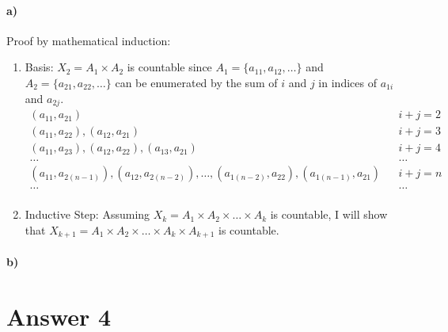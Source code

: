 \documentclass[12pt]{article}
\newcommand\+{\mkern2mu}
\begin{document}
\paragraph{a)}
Proof by mathematical induction:
\begin{enumerate}
\item Basis: $X_2 = A_1 \times A_2$ is countable since $A_1 = \{a_{11}, a_{12}, \dotsc \}$ and $A_2 = \{a_{21}, a_{22}, \dotsc \}$ can be enumerated by the sum of $i$ and $j$ in indices of $a_{1i}$ and $a_{2j}$.
\begin{align*}
(a_{11}, a_{21}) && i + j = 2 \\
(a_{11}, a_{22}), (a_{12}, a_{21}) && i + j = 3 \\
(a_{11}, a_{23}), (a_{12}, a_{22}), (a_{13}, a_{21}) && i + j = 4 \\
\dotsc && \dotsc \\
(a_{11}, a_{2(n-1)}), (a_{12}, a_{2(n-2)}), \dotsc, (a_{1(n-2)}, a_{22}), (a_{1(n-1)}, a_{21}) && i + j = n\\
\dotsc && \dotsc \\
\end{align*}
\item Inductive Step: Assuming $X_k = A_1 \times A_2 \times \dotsc \times A_k$ is countable, I will show that $X_{k+1} = A_1 \times A_2 \times \dotsc \times A_k \times A_{k+1}$ is countable.
\end{enumerate}
\paragraph{b)}

\section*{Answer 4}
\end{document}
